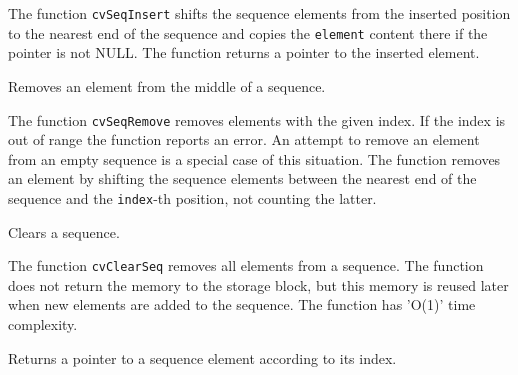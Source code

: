 The function \texttt{cvSeqInsert} shifts the sequence elements from the inserted position to the nearest end of the sequence and copies the \texttt{element} content there if the pointer is not NULL. The function returns a pointer to the inserted element.
\fi

\label{SeqRemove}

Removes an element from the middle of a sequence.


\begin{description}
\end{description}


The function \texttt{cvSeqRemove} removes elements with the given
index. If the index is out of range the function reports an error. An
attempt to remove an element from an empty sequence is a special
case of this situation. The function removes an element by shifting
the sequence elements between the nearest end of the sequence and the
\texttt{index}-th position, not counting the latter.


\label{ClearSeq}

Clears a sequence.


\begin{description}
\end{description}


The function \texttt{cvClearSeq} removes all elements from a
sequence. The function does not return the memory to the storage block, but this
memory is reused later when new elements are added to the sequence. The function has
'O(1)' time complexity.

\ifC
{}\label{GetSeqElem}

Returns a pointer to a sequence element according to its index.


